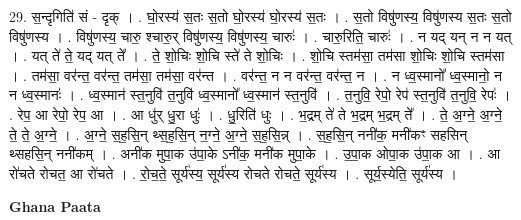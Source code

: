 \documentclass[17pt]{extarticle}
\begin{document}
29. स॒न्दृगिति॑ सं - दृक् । . घो॒रस्य॑ स॒तः स॒तो घो॒रस्य॑ घो॒रस्य॑ स॒तः । . स॒तो विषु॑णस्य॒ विषु॑णस्य स॒तः स॒तो विषु॑णस्य । . विषु॑णस्य॒ चारु॒ श्चारु॒र् विषु॑णस्य॒ विषु॑णस्य॒ चारुः॑ । . चारु॒रिति॒ चारुः॑ । . न यद् यन् न न यत् । . यत् ते॑ ते॒ यद् यत् ते᳚ । . ते॒ शो॒चिः शो॒चि स्ते॑ ते शो॒चिः । . शो॒चि स्तम॑सा॒ तम॑सा शो॒चिः शो॒चि स्तम॑सा । . तम॑सा॒ वर॑न्त॒ वर॑न्त॒ तम॑सा॒ तम॑सा॒ वर॑न्त । . वर॑न्त॒ न न वर॑न्त॒ वर॑न्त॒ न । . न ध्व॒स्मानो᳚ ध्व॒स्मानो॒ न न ध्व॒स्मानः॑ । . ध्व॒स्मान॑ स्त॒नुवि॑ त॒नुवि॑ ध्व॒स्मानो᳚ ध्व॒स्मान॑ स्त॒नुवि॑ । . त॒नुवि॒ रेपो॒ रेप॑ स्त॒नुवि॑ त॒नुवि॒ रेपः॑ । . रेप॒ आ रेपो॒ रेप॒ आ । . आ धु॑र् धु॒रा धुः॑ । . धु॒रिति॑ धुः । . भ॒द्रम् ते॑ ते भ॒द्रम् भ॒द्रम् ते᳚ । . ते॒ अ॒ग्ने॒ अ॒ग्ने॒ ते॒ ते॒ अ॒ग्ने॒ । . अ॒ग्ने॒ स॒ह॒सि॒न् थ्स॒ह॒सि॒न् न॒ग्ने॒ अ॒ग्ने॒ स॒ह॒सि॒न्न् । . स॒ह॒सि॒न् ननी॑क॒ मनी॑कꣳ सहसिन् थ्सहसि॒न् ननी॑कम् । . अनी॑क मुपा॒क उ॑पा॒के ऽनी॑क॒ मनी॑क मुपा॒के । . उ॒पा॒क ओपा॒क उ॑पा॒क आ । . आ रो॑चते रोचत॒ आ रो॑चते । . रो॒च॒ते॒ सूर्य॑स्य॒ सूर्य॑स्य रोचते रोचते॒ सूर्य॑स्य । . सूर्य॒स्येति॒ सूर्य॑स्य । \newline

\textbf{Ghana Paata } \newline
\end{document}
